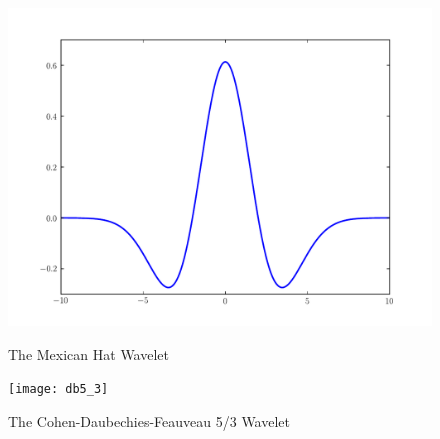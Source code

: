 \begin{figure}[H]
    \includegraphics[width=\linewidth]{mexicanHat}
    \caption{The Mexican Hat Wavelet}
\endminipage\hfill
{}
    \texttt{[image: db5\_3]}
    \caption{The Cohen-Daubechies-Feauveau 5/3 Wavelet}
\endminipage
\end{figure}

